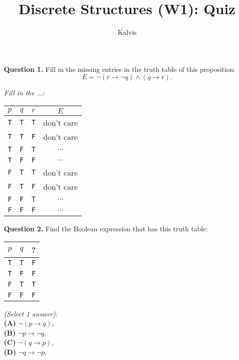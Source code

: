 \documentclass[jou]{apa6}
\title{Discrete Structures (W1): Quiz}
\author{Kalvis}
\affiliation{RBS}
\begin{document}
\maketitle

{\bf Question 1.} Fill in the missing entries in the truth table of this proposition:
$$E = \neg(r \rightarrow \neg q) \wedge (q \rightarrow r).$$

\vspace{3pt}
\noindent
{\em Fill in the $\ldots$:}

\begin{tabular}{ c | c | c | c }
$p$ & $q$ & $r$ & $E$ \\ \hline
{\tt T} & {\tt T} & {\tt T} & don't care \\ \hline
{\tt T} & {\tt T} & {\tt F} & don't care \\ \hline
{\tt T} & {\tt F} & {\tt T} & $\ldots$ \\ \hline
{\tt T} & {\tt F} & {\tt F} & $\ldots$ \\ \hline
{\tt F} & {\tt T} & {\tt T} & don't care \\ \hline
{\tt F} & {\tt T} & {\tt F} & don't care \\ \hline
{\tt F} & {\tt F} & {\tt T} & $\ldots$ \\ \hline
{\tt F} & {\tt F} & {\tt F} & $\ldots$ \\ \hline
\end{tabular}

\vspace{10pt}
{\bf Question 2.} Find the Boolean expression that has this truth table:

\begin{tabular}{ c | c | c }
$p$ & $q$ & ? \\ \hline
{\tt T} & {\tt T} & {\tt F} \\ \hline
{\tt T} & {\tt F} & {\tt F} \\ \hline
{\tt F} & {\tt T} & {\tt T} \\ \hline
{\tt F} & {\tt F} & {\tt F} \\ \hline
\end{tabular}

\noindent
\vspace{3pt}
{\em (Select 1 answer):}\\
{\bf (A)} $\neg (p \rightarrow q)$,\\
{\bf (B)} $\neg p \rightarrow \neg q$,\\
{\bf (C)} $\neg (q \rightarrow p)$,\\
{\bf (D)} $\neg q \rightarrow \neg p$.
\end{document}
